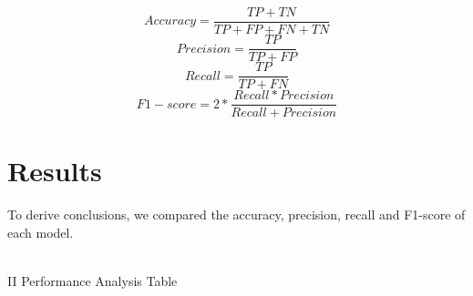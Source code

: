 \documentclass[conference]{IEEEtran}
\begin{document}
    \begin{equation}
    Accuracy  = \frac{TP+TN}{TP+FP+FN+TN}
    \end{equation}
    \begin{equation}
        Precision = \frac{TP}{TP+FP}
    \end{equation}
    \begin{equation}
        Recall = \frac{TP}{TP+FN}
    \end{equation}
    \begin{equation}
        F1-score = 2 * \frac{Recall * Precision}{Recall + Precision}
    \end{equation}

\section{\normalsize{Results}}
    To derive conclusions, we compared the accuracy, precision, recall and F1-score of each model.\\\\
    \centerline{\footnotesize{II Performance Analysis Table}}
    
\end{document}
